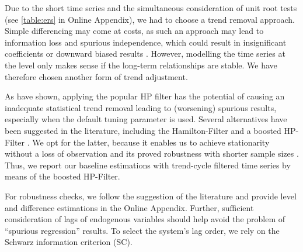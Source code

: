 Due to the short time series and the simultaneous consideration of unit root tests (see \ref{table:ers} in Online Appendix), we had to choose a trend removal approach. Simple differencing may come at costs, as such an approach may lead to information loss and spurious independence, which could result in insignificant coefficients or downward biased results \citep[201]{Kirchgaesser.2007}. However, modelling the time series at the level only makes sense if the long-term relationships are stable. We have therefore chosen another form of trend adjustment.

As \cite{hamilton.2018, phillips.2021b} have shown, applying the popular HP filter \citep{hodrick.1997} has the potential of causing an inadequate statistical trend removal leading to (worsening) spurious results, especially when the default tuning parameter is used. Several alternatives have been suggested in the literature, including the Hamilton-Filter \citep{hamilton.2018} and a boosted HP-Filter \citep{phillips.2021}. We opt for the latter, because it enables us to achieve stationarity without a loss of observation and its proved robustness with shorter sample sizes \citep{phillips.2021b}. Thus, we report our baseline estimations with trend-cycle filtered time series by means of the boosted HP-Filter. 

For robustness checks, we follow the suggestion of the literature \citep[159]{Kirchgaesser.2007} and provide level and difference estimations in the Online Appendix. Further, sufficient consideration of lags of endogenous variables should help avoid the problem of ``spurious regression'' results. To select the system's lag order, we rely on the Schwarz information criterion (SC).
 
